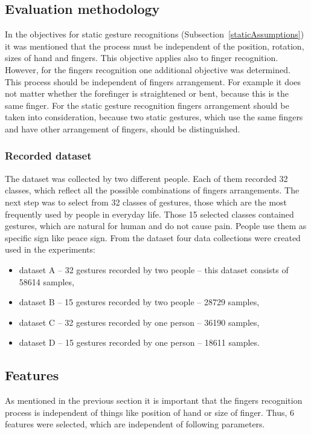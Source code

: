 \subsection{Evaluation methodology} \label{fdEvaluationMethodology}
In the objectives for static gesture recognitions (Subsection~\ref{staticAssumptions}) it was mentioned that the process must be independent of the position, rotation, sizes of hand and fingers. This objective applies also to finger recognition. However, for the fingers recognition one additional objective was determined. This process should be independent of fingers arrangement. For example it does not matter whether the forefinger is straightened or bent, because this is the same finger. For the static gesture recognition fingers arrangement should be taken into consideration, because two static gestures, which use the same fingers and have other arrangement of fingers, should be distinguished.

\subsubsection*{Recorded dataset}
The dataset was collected by two different people. Each of them  recorded 32 classes, which reflect all the possible combinations of fingers arrangements. The next step was to select from 32 classes of gestures, those which are the most frequently used by people in everyday life. Those 15 selected classes contained gestures, which are natural for human and do not cause pain. People use them as specific sign like peace sign. From the dataset four data collections were created used in the experiments:
\begin{itemize}
\item dataset A -- 32 gestures recorded by two people -- this dataset consists of 58614 samples,
\item dataset B -- 15 gestures recorded by two people -- 28729 samples,
\item dataset C -- 32 gestures recorded by one person -- 36190 samples,
\item dataset D -- 15 gestures recorded by one person -- 18611 samples.
\end{itemize}

\subsection{Features}
As mentioned in the previous section it is important that the fingers recognition process is independent of things like position of hand or size of finger. Thus, 6 features were selected, which are independent of following parameters. 

